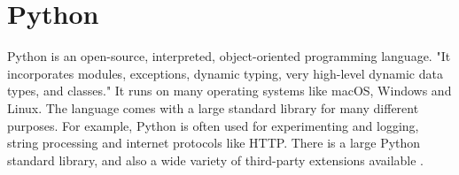 \section{Python}
Python is an open-source, interpreted, object-oriented programming language. "It incorporates modules, exceptions, dynamic typing, very high-level dynamic data types, and classes." It runs on many operating systems like macOS, Windows and Linux.
The language comes with a large standard library for many different purposes. For example, Python is often used for experimenting and logging, string processing and internet protocols like HTTP. There is a large Python standard library, and also a wide variety of third-party extensions available \cite{python}.
